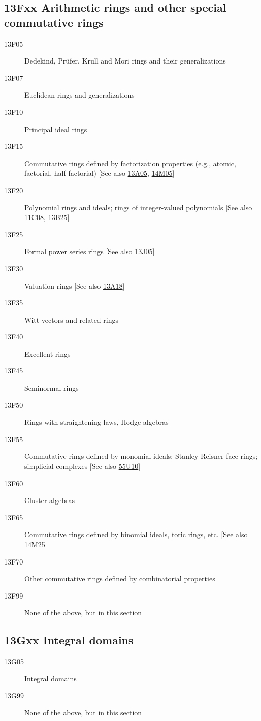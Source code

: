 \subsection*{13Fxx Arithmetic rings and other special commutative rings }\label{13Fxx}
\begin{description}          
\item [13F05]\label{13F05} Dedekind, Pr\"{u}fer, Krull and Mori rings and their generalizations
\item [13F07]\label{13F07} Euclidean rings and generalizations
\item [13F10]\label{13F10} Principal ideal rings
\item [13F15]\label{13F15} Commutative rings defined by factorization properties (e.g., atomic, factorial, half-factorial) [See also \hyperref[13A05]{13A05}, \hyperref[14M05]{14M05}]
\item [13F20]\label{13F20} Polynomial rings and ideals; rings of integer-valued polynomials [See also \hyperref[11C08]{11C08}, \hyperref[13B25]{13B25}]
\item [13F25]\label{13F25} Formal power series rings [See also \hyperref[13J05]{13J05}]
\item [13F30]\label{13F30} Valuation rings [See also \hyperref[13A18]{13A18}]
\item [13F35]\label{13F35} Witt vectors and related rings
\item [13F40]\label{13F40} Excellent rings
\item [13F45]\label{13F45} Seminormal rings
\item [13F50]\label{13F50} Rings with straightening laws, Hodge algebras
\item [13F55]\label{13F55} Commutative rings defined by monomial ideals; Stanley-Reisner face rings; simplicial complexes [See also \hyperref[55U10]{55U10}]
\item [13F60]\label{13F60} Cluster algebras
\item [13F65]\label{13F65} Commutative rings defined by binomial ideals, toric rings, etc. [See also \hyperref[14M25]{14M25}]
\item [13F70]\label{13F70} Other commutative rings defined by combinatorial properties
\item [13F99]\label{13F99} None of the above, but in this section
\end{description}          
\subsection*{13Gxx Integral domains }\label{13Gxx}
\begin{description}               
\item [13G05]\label{13G05} Integral domains
\item [13G99]\label{13G99} None of the above, but in this section
\end{description}          
